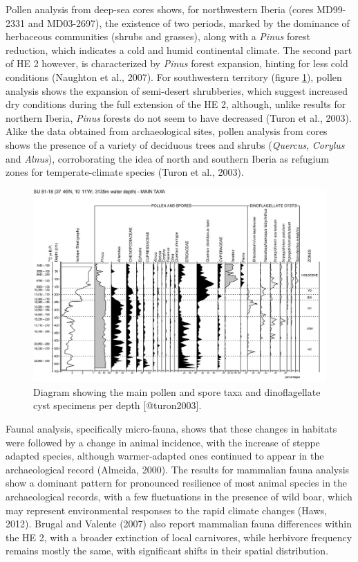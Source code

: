 \documentclass[12pt,twoside]{reedthesis}
\begin{document}
Pollen analysis from deep-sea cores shows, for northwestern Iberia (cores MD99-2331 and MD03-2697), the existence of two periods, marked by the dominance of herbaceous communities (shrubs and grasses), along with a \emph{Pinus} forest reduction, which indicates a cold and humid continental climate. The second part of HE 2 however, is characterized by \emph{Pinus} forest expansion, hinting for less cold conditions (Naughton et al., 2007). For southwestern territory (figure \ref{fig:su8118}), pollen analysis shows the expansion of semi-desert shrubberies, which suggest increased dry conditions during the full extension of the HE 2, although, unlike results for northern Iberia, \emph{Pinus} forests do not seem to have decreased (Turon et al., 2003). Alike the data obtained from archaeological sites, pollen analysis from cores shows the presence of a variety of deciduous trees and shrubs (\emph{Quercus}, \emph{Corylus} and \emph{Alnus}), corroborating the idea of north and southern Iberia as refugium zones for temperate-climate species (Turon et al., 2003).
\begin{figure}

{\centering \includegraphics[width=0.8\linewidth]{figure/Turon2003_SU81-18} 

}

\caption{Diagram showing the main pollen and spore taxa and dinoflagellate cyst specimens per depth [@turon2003].}\label{fig:su8118}
\end{figure}
Faunal analysis, specifically micro-fauna, shows that these changes in habitats were followed by a change in animal incidence, with the increase of steppe adapted species, although warmer-adapted ones continued to appear in the archaeological record (Almeida, 2000). The results for mammalian fauna analysis show a dominant pattern for pronounced resilience of most animal species in the archaeological records, with a few fluctuations in the presence of wild boar, which may represent environmental responses to the rapid climate changes (Haws, 2012). Brugal and Valente (2007) also report mammalian fauna differences within the HE 2, with a broader extinction of local carnivores, while herbivore frequency remains mostly the same, with significant shifts in their spatial distribution.
\end{document}
